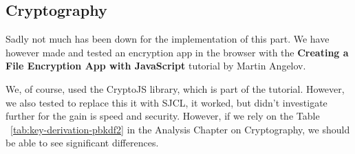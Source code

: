 
\subsection{Cryptography}
Sadly not much has been down for the implementation of this part. We have however made and tested an encryption app in the browser with the \textbf{Creating a File Encryption App with JavaScript} tutorial\cite{Angelov2013CreatingJavaScript} by Martin Angelov.

We, of course, used the CryptoJS library\cite{Brix2013CryptoJS}, which is part of the tutorial. However, we also tested to replace this it with SJCL\cite{Stark2009SymmetricJavascript}, it worked, but didn't investigate further for the gain is speed and security. However, if we rely on the Table ~\ref{tab:key-derivation-pbkdf2} in the Analysis Chapter on Cryptography, we should be able to see significant differences.


